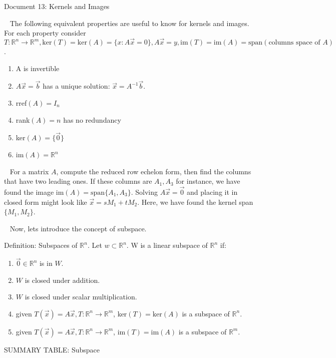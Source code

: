\documentclass[11 pt]{article}
\begin{document}
\begin{center}
Document 13: Kernels and Images
\end{center}

\setlength{\leftskip}{0in}
$\,\,\,$ The following equivalent properties are useful to know for kernels and images. For each property consider $T:\mathbb{R}^n\rightarrow\mathbb{R}^m,\text{ker}(T)=\text{ker}(A)=\{x:A\vec{x}=0\},A\vec{x}=y,\text{im}(T)=\text{im}(A)=\text{span}(\text{columns space of }A)$.
\begin{enumerate}
\item A is invertible
\item $A\vec{x}=\vec{b}$ has a unique solution: $\vec{x}=A^{-1}\vec{b}$.
\item rref$(A)=I_n$
\item rank$(A)=n$ has no redundancy
\item ker$(A)=\{\vec{0}\}$
\item im$(A)=\mathbb{R}^n$
\end{enumerate}

$\,\,\,$ For a matrix $A$, compute the reduced row echelon form, then find the columns that have two leading ones. If these columns are $A_1,A_3$ for instance, we have found the image im$(A)=\text{span}\{A_1,A_3\}$. Solving $A\vec{x}=\vec{0}$ and placing it in closed form might look like $\vec{x}=sM_1+tM_2$. Here, we have found the kernel span$\{M_1,M_2\}$.

$\,\,\,$ Now, lets introduce the concept of subspace.

Definition: Subspaces of $\mathbb{R}^n$. Let $w\subset \mathbb{R}^n$. W is a linear subspace of $\mathbb{R}^n$ if:
\begin{enumerate}
\item $\vec{0}\in\mathbb{R}^n$ is in $W$.
\item $W$ is closed under addition.
\item $W$ is closed under scalar multiplication.
\item given $T(\vec{x})=A\vec{x},T:\mathbb{R}^n\rightarrow\mathbb{R}^m$, ker$(T)=\text{ker}(A)$ is a subspace of $\mathbb{R}^n$.
\item given $T(\vec{x})=A\vec{x},T:\mathbb{R}^n\rightarrow\mathbb{R}^m$, im$(T)=\text{im}(A)$ is a subspace of $\mathbb{R}^m$.
\end{enumerate}


\begin{center}
SUMMARY TABLE: Subspace
\end{center}
\end{document}
